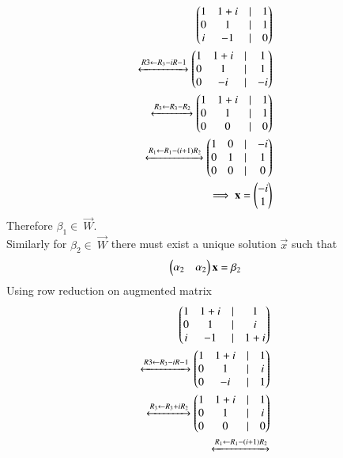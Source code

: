 \documentclass[journal,12pt,twocolumn]{IEEEtran}
\begin{document}
\begin{enumerate}[label=\emph{\alph*)}]
		\begin{align}
			\begin{pmatrix}1 & 1+i & | & 1 \\
			       0 & 1   & | & 1 \\
			       i & -1  & | & 0\end{pmatrix}\\
			\xleftrightarrow[]{R3 \leftarrow R_3-iR-1}
			\begin{pmatrix}1 & 1+i & | & 1 \\
			       0 & 1   & | & 1 \\
			       0 & -i  & | & -i\end{pmatrix}\\
			\xleftrightarrow[]{R_3 \leftarrow R_3-R_2}
			\begin{pmatrix}1 & 1+i & | & 1 \\
			       0 & 1   & | & 1 \\
			       0 & 0  &  | & 0\end{pmatrix}\\
			\xleftrightarrow[]{R_1 \leftarrow R_1-(i+1)R_2}
			\begin{pmatrix}1 & 0 &  | & -i \\
			       0 & 1   &| & 1 \\
			       0 & 0  & | & 0 \end{pmatrix}\\
			       \implies 
			       \mathbf{x}=\begin{pmatrix}-i\\1\end{pmatrix}
		\end{align}
Therefore $\beta_1  \in \ \vec{W}$.\\
		Similarly for $\beta_2 \in \ \vec{W}$ there must exist a unique solution $\vec{x}$
		such that
		\begin{align}
			\begin{pmatrix}\alpha_2 & \alpha_2\end{pmatrix}\mathbf{x}=\beta_2
		\end{align}
		Using row reduction on augmented matrix 
		\begin{align}
			\myvec{1 & 1+i & | & 1 \\
                               0 & 1   & | & i \\
                               i & -1  & | & 1+i}\\
                        \xleftrightarrow[]{R3 \leftarrow R_3-iR-1}
                        \myvec{1 & 1+i & | & 1 \\
                               0 & 1   & | & i \\
                               0 & -i  & | & 1}\\
                        \xleftrightarrow[]{R_3 \leftarrow R_3+iR_2}
                        \myvec{1 & 1+i & | & 1 \\
                               0 & 1   & | & i \\
                               0 & 0  &  | & 0}\\
                        \xleftrightarrow[]{R_1 \leftarrow R_1-(i+1)R_2}

\end{align}
\end{enumerate}
\end{document}
